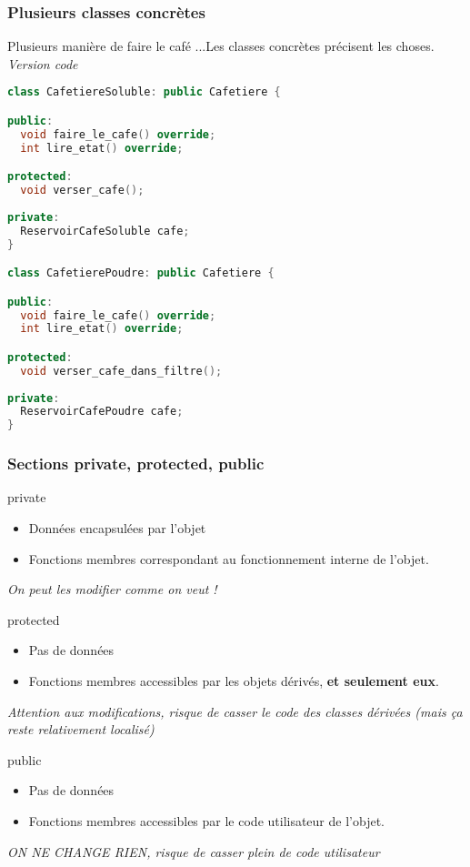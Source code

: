 \documentclass{beamer}
\begin{document}
\begin{frame}[fragile=singleslide,shrink=20]
\frametitle {Plusieurs classes concrètes}

\begin{block}{Plusieurs manière de faire le café}
...Les classes concrètes précisent les choses. \em{Version code}
\end{block}

\begin{lstlisting}[language=c++]
class CafetiereSoluble: public Cafetiere {

public:
  void faire_le_cafe() override;
  int lire_etat() override;

protected:
  void verser_cafe();
  
private:
  ReservoirCafeSoluble cafe;
}

class CafetierePoudre: public Cafetiere {

public:
  void faire_le_cafe() override;
  int lire_etat() override;

protected:
  void verser_cafe_dans_filtre();
  
private:
  ReservoirCafePoudre cafe;
}
\end{lstlisting}

\end{frame}

\begin{frame}[fragile=singleslide,shrink=20]
\frametitle {Sections private, protected, public}

\begin{block}{private}
\begin{itemize}
\item{Données encapsulées par l'objet}
\item{Fonctions membres correspondant au fonctionnement interne de l'objet.}
\end{itemize}
\em{On peut les modifier comme on veut !}
\end{block}

\begin{block}{protected}
\begin{itemize}
\item{Pas de données}
\item{Fonctions membres accessibles par les objets dérivés, \textbf{et seulement eux}.}
\end{itemize}
\em{Attention aux modifications, risque de casser le code des classes dérivées} (mais ça reste relativement localisé)
\end{block}

\begin{block}{public}
\begin{itemize}
\item{Pas de données}
\item{Fonctions membres accessibles par le code utilisateur de l'objet}.
\end{itemize}
\em{ ON NE CHANGE RIEN, risque de casser plein de code utilisateur}
\end{block}

\end{frame}
\end{document}
